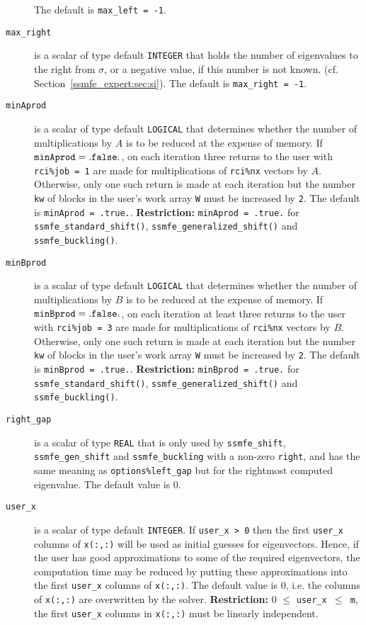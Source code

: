 \begin{description}
The default is {\tt max\_left = -1}.
%
\item[\texttt{max\_right}]
is a scalar of type default \texttt{INTEGER} that
holds the number of eigenvalues to the right from $\sigma$,
or a negative value, if this number is not known.
(cf. Section~\ref{ssmfe_expert:sec:si}).
The default is {\tt max\_right = -1}.
%
\item[\texttt{minAprod}] is a scalar of type default \texttt{LOGICAL} that
determines whether the number of multiplications by $A$ 
is to be reduced at the expense of memory. 
If ${\tt minAprod = .false.}$, 
on each iteration three returns to the user
with {\tt rci\%job = 1} are
made for multiplications of {\tt rci\%nx} vectors by $A$.
Otherwise,  only one such return is made at each iteration but 
the number {\tt kw} of blocks in the user's work array {\tt W} 
must be increased by {\tt 2}.
The default is {\tt minAprod = .true.}.
{\bf Restriction:} {\tt minAprod = .true.} %
for {\tt ssmfe\_standard\_shift()}, {\tt ssmfe\_generalized\_shift()}
and  {\tt ssmfe\_buckling()}.
%
\item[\texttt{minBprod}] is a scalar of type default \texttt{LOGICAL} that
determines whether the number of multiplications by $B$ 
is to be reduced at the expense of memory. 
If ${\tt minBprod = .false.}$, 
on each iteration at least three returns to the user
with {\tt rci\%job = 3} are
made for multiplications of {\tt rci\%nx} vectors by $B$.
Otherwise,  only one such return is made at each iteration but 
the number {\tt kw} of blocks in the user's work array {\tt W} 
must be increased by {\tt 2}.
The default is {\tt minBprod = .true.}.
{\bf Restriction:} {\tt minBprod = .true.} %
for {\tt ssmfe\_standard\_shift()}, {\tt ssmfe\_generalized\_shift()}
and  {\tt ssmfe\_buckling()}.
%
\item[\texttt{right\_gap}]
is a scalar of type \texttt{REAL}
that is only used by 
{\tt ssmfe\_shift}, {\tt ssmfe\_gen\_shift}
and {\tt ssmfe\_buckling}
with a non-zero {\tt right}, and
has the same meaning as {\tt options\%left\_gap}
but for the rightmost computed eigenvalue.
The default value is 0.
%
\item[\texttt{user\_x}] is a scalar of type default \texttt{INTEGER}. 
If {\tt user\_x > 0} then the first {\tt user\_x} columns
of {\tt x(:,:)} will be used as initial guesses for eigenvectors.
Hence, if the user has good approximations
to some of the required eigenvectors, the computation time
may be reduced by putting these approximations
into the first {\tt user\_x} columns of {\tt x(:,:)}.
The default value is 0, 
i.e. the columns of {\tt x(:,:)} are overwritten by the solver.
{\bf Restriction:} {0 $\le$ \tt user\_x $\le$ m},
the first {\tt user\_x} columns in {\tt x(:,:)}
must be linearly independent.
%
\end{description}

